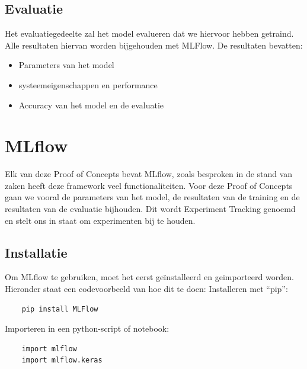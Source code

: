 \subsection{Evaluatie}
Het evaluatiegedeelte zal het model evalueren dat we hiervoor hebben getraind. Alle resultaten hiervan worden bijgehouden met MLFlow. De resultaten bevatten:
\begin{itemize}
    \item Parameters van het model
    \item systeemeigenschappen en performance
    \item Accuracy van het model en de evaluatie
\end{itemize}

\section{MLflow}
Elk van deze Proof of Concepts bevat MLflow, zoals besproken in de stand van zaken heeft deze framework veel functionaliteiten. Voor deze Proof of Concepts gaan we vooral de parameters van het model, de resultaten van de training en de resultaten van de evaluatie bijhouden. Dit wordt Experiment Tracking genoemd en stelt ons in staat om experimenten bij te houden.
\subsection{Installatie}
Om MLflow te gebruiken, moet het eerst geïnstalleerd en geïmporteerd worden. Hieronder staat een codevoorbeeld van hoe dit te doen:
Installeren met ``pip'':
\begin{verbatim}
    pip install MLFlow
\end{verbatim}
Importeren in een python-script of notebook:
\begin{verbatim}
    import mlflow
    import mlflow.keras
\end{verbatim}

